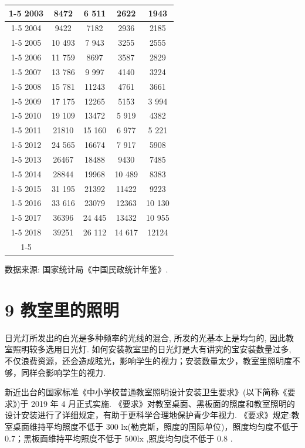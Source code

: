 \documentclass[10pt]{article}
\begin{document}
\begin{center}
{\begin{tabular}{|c|c|c|c|c|}
\cline{1-5}
2003 & 8472 & 6 511 & 2622 & 1943 \\
\cline{1-5}
2004 & 9422 & 7182 & 2936 & 2185 \\
\cline{1-5}
2005 & 10 493 & 7 943 & 3255 & 2555 \\
\cline{1-5}
2006 & 11 759 & 8697 & 3587 & 2829 \\
\cline{1-5}
2007 & 13 786 & 9 997 & 4140 & 3224 \\
\cline{1-5}
2008 & 15 781 & 11243 & 4761 & 3661 \\
\cline{1-5}
2009 & 17 175 & 12265 & 5153 & 3 994 \\
\cline{1-5}
2010 & 19 109 & 13472 & 5 919 & 4382 \\
\cline{1-5}
2011 & 21810 & 15 160 & 6 977 & 5 221 \\
\cline{1-5}
2012 & 24 565 & 16674 & 7 917 & 5908 \\
\cline{1-5}
2013 & 26467 & 18488 & 9430 & 7485 \\
\cline{1-5}
2014 & 28844 & 19968 & 10 489 & 8383 \\
\cline{1-5}
2015 & 31 195 & 21392 & 11422 & 9223 \\
\cline{1-5}
2016 & 33 616 & 23079 & 12363 & 10 130 \\
\cline{1-5}
2017 & 36396 & 24 445 & 13432 & 10 955 \\
\cline{1-5}
2018 & 39251 & 26 112 & 14 617 & 12124 \\
\cline{1-5}
\hline
\end{tabular}
}
\end{center}

数据来源: 国家统计局《中国民政统计年鉴》.



\section*{9 教室里的照明}

日光灯所发出的白光是多种频率的光线的混合, 所发的光基本上是均匀的, 因此教室照明较多选用日光灯. 如何安装教室里的日光灯是大有讲究的宝安装数量过多, 不仅浪费资源，还会造成眩光，影响学生的视力；安装数量太少，教室里照明度不够，同样会影响学生的视力.

新近出台的国家标准《中小学校普通教室照明设计安装卫生要求》(以下简称《要求》)于 2019 年 4 月正式实施. 《要求》对教室桌面、黑板面的照度和教室照明的设计安装进行了详细规定，有助于更科学合理地保护青少年视力. 《要求》规定:教室桌面维持平均照度不低于 300 lx(勒克斯，照度的国际单位)，照度均匀度不低于 0.7；黑板面维持平均照度不低于 \({500}\mathrm{{lx}}\) ,照度均匀度不低于 0.8 .
\end{document}
